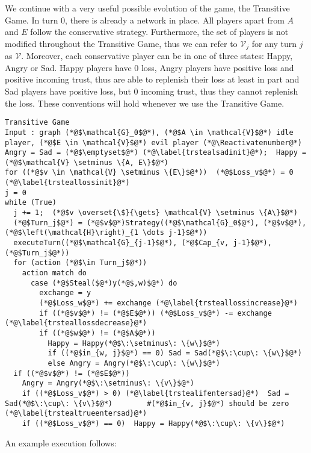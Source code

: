 \documentclass[11pt]{llncs}
\makeatletter
\newcommand*\Suppressnumber{%
  \lst@AddToHook{OnNewLine}{%
    \let\thelstnumber\relax%
     \advance\c@lstnumber-\@ne\relax%
    }%
}
\theoremstyle{definition}
\makeatother
\begin{document}
     We continue with a very useful possible evolution of the game, the Transitive Game. In turn 0, there is already a network
     in place. All players apart from $A$ and $E$ follow the conservative strategy. Furthermore, the set of players is not
     modified throughout the Transitive Game, thus we can refer to $\mathcal{V}_j$ for any turn $j$ as $\mathcal{V}$.
     Moreover, each conservative player can be in one of three states: Happy, Angry or Sad. Happy players have 0 loss, Angry
     players have positive loss and positive incoming trust, thus are able to replenish their loss at least in part and
     Sad players have positive loss, but 0 incoming trust, thus they cannot replenish the loss. These conventions will hold
     whenever we use the Transitive Game.
     \Suppressnumber
     \begin{lstlisting}[label=transitivegame, style=numbers]
Transitive Game
Input : graph (*@$\mathcal{G}_0$@*), (*@$A \in \mathcal{V}$@*) idle player, (*@$E \in \mathcal{V}$@*) evil player (*@\Reactivatenumber@*)
Angry = Sad = (*@$\emptyset$@*) (*@\label{trstealsadinit}@*);  Happy = (*@$\mathcal{V} \setminus \{A, E\}$@*)
for ((*@$v \in \mathcal{V} \setminus \{E\}$@*))  (*@$Loss_v$@*) = 0 (*@\label{trsteallossinit}@*)
j = 0
while (True)
  j += 1;  (*@$v \overset{\$}{\gets} \mathcal{V} \setminus \{A\}$@*)
  (*@$Turn_j$@*) = (*@$v$@*)Strategy((*@$\mathcal{G}_0$@*), (*@$v$@*), (*@$\left(\mathcal{H}\right)_{1 \dots j-1}$@*))
  executeTurn((*@$\mathcal{G}_{j-1}$@*), (*@$Cap_{v, j-1}$@*), (*@$Turn_j$@*))
  for (action (*@$\in Turn_j$@*))
    action match do
      case (*@$Steal($@*)y(*@$,w)$@*) do
        exchange = y
        (*@$Loss_w$@*) += exchange (*@\label{trsteallossincrease}@*)
        if ((*@$v$@*) != (*@$E$@*)) (*@$Loss_v$@*) -= exchange (*@\label{trsteallossdecrease}@*)
        if ((*@$w$@*) != (*@$A$@*))
          Happy = Happy(*@$\:\setminus\: \{w\}$@*)
          if ((*@$in_{w, j}$@*) == 0) Sad = Sad(*@$\:\cup\: \{w\}$@*)
          else Angry = Angry(*@$\:\cup\: \{w\}$@*)
  if ((*@$v$@*) != (*@$E$@*))
    Angry = Angry(*@$\:\setminus\: \{v\}$@*)
    if ((*@$Loss_v$@*) > 0) (*@\label{trstealifentersad}@*)  Sad = Sad(*@$\:\cup\: \{v\}$@*)        #(*@$in_{v, j}$@*) should be zero (*@\label{trstealtrueentersad}@*)
    if ((*@$Loss_v$@*) == 0)  Happy = Happy(*@$\:\cup\: \{v\}$@*)
     \end{lstlisting}

     An example execution follows:
\end{document}
